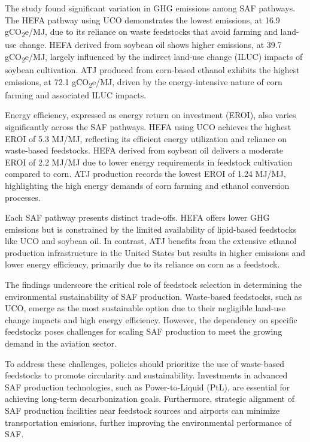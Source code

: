 \documentclass[12pt]{article}
\begin{document}
The study found significant variation in GHG emissions among SAF pathways. The HEFA pathway using UCO demonstrates the lowest emissions, at 16.9 gCO\textsubscript{2}e/MJ, due to its reliance on waste feedstocks that avoid farming and land-use change. HEFA derived from soybean oil shows higher emissions, at 39.7 gCO\textsubscript{2}e/MJ, largely influenced by the indirect land-use change (ILUC) impacts of soybean cultivation. ATJ produced from corn-based ethanol exhibits the highest emissions, at 72.1 gCO\textsubscript{2}e/MJ, driven by the energy-intensive nature of corn farming and associated ILUC impacts.

Energy efficiency, expressed as energy return on investment (EROI), also varies significantly across the SAF pathways. HEFA using UCO achieves the highest EROI of 5.3 MJ/MJ, reflecting its efficient energy utilization and reliance on waste-based feedstocks. HEFA derived from soybean oil delivers a moderate EROI of 2.2 MJ/MJ due to lower energy requirements in feedstock cultivation compared to corn. ATJ production records the lowest EROI of 1.24 MJ/MJ, highlighting the high energy demands of corn farming and ethanol conversion processes.

Each SAF pathway presents distinct trade-offs. HEFA offers lower GHG emissions but is constrained by the limited availability of lipid-based feedstocks like UCO and soybean oil. In contrast, ATJ benefits from the extensive ethanol production infrastructure in the United States but results in higher emissions and lower energy efficiency, primarily due to its reliance on corn as a feedstock.

The findings underscore the critical role of feedstock selection in determining the environmental sustainability of SAF production. Waste-based feedstocks, such as UCO, emerge as the most sustainable option due to their negligible land-use change impacts and high energy efficiency. However, the dependency on specific feedstocks poses challenges for scaling SAF production to meet the growing demand in the aviation sector.

To address these challenges, policies should prioritize the use of waste-based feedstocks to promote circularity and sustainability. Investments in advanced SAF production technologies, such as Power-to-Liquid (PtL), are essential for achieving long-term decarbonization goals. Furthermore, strategic alignment of SAF production facilities near feedstock sources and airports can minimize transportation emissions, further improving the environmental performance of SAF.
\end{document}
